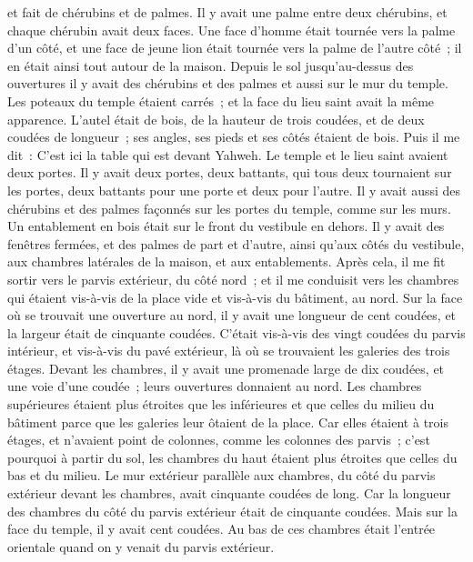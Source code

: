 \begin{multicols}{2}
et fait de chérubins et de palmes. Il y avait une palme entre deux chérubins, et chaque chérubin avait deux faces.
Une face d'homme était tournée vers la palme d'un côté, et une face de jeune lion était tournée vers la palme de l'autre côté~; il en était ainsi tout autour de la maison.
Depuis le sol jusqu'au-dessus des ouvertures il y avait des chérubins et des palmes et aussi sur le mur du temple.
Les poteaux du temple étaient carrés~; et la face du lieu saint avait la même apparence.
L'autel était de bois, de la hauteur de trois coudées, et de deux coudées de longueur~; ses angles, ses pieds et ses côtés étaient de bois. Puis il me dit~: C'est ici la table qui est devant Yahweh.
Le temple et le lieu saint avaient deux portes.
Il y avait deux portes, deux battants, qui tous deux tournaient sur les portes, deux battants pour une porte et deux pour l'autre.
Il y avait aussi des chérubins et des palmes façonnés sur les portes du temple, comme sur les murs. Un entablement en bois était sur le front du vestibule en dehors.
Il y avait des fenêtres fermées, et des palmes de part et d'autre, ainsi qu'aux côtés du vestibule, aux chambres latérales de la maison, et aux entablements.
\VerseOne{}Après cela, il me fit sortir vers le parvis extérieur, du côté nord~; et il me conduisit vers les chambres qui étaient vis-à-vis de la place vide et vis-à-vis du bâtiment, au nord.
Sur la face où se trouvait une ouverture au nord, il y avait une longueur de cent coudées, et la largeur était de cinquante coudées.
C'était vis-à-vis des vingt coudées du parvis intérieur, et vis-à-vis du pavé extérieur, là où se trouvaient les galeries des trois étages.
Devant les chambres, il y avait une promenade large de dix coudées, et une voie d'une coudée~; leurs ouvertures donnaient au nord.
Les chambres supérieures étaient plus étroites que les inférieures et que celles du milieu du bâtiment parce que les galeries leur ôtaient de la place.
Car elles étaient à trois étages, et n'avaient point de colonnes, comme les colonnes des parvis~; c'est pourquoi à partir du sol, les chambres du haut étaient plus étroites que celles du bas et du milieu.
Le mur extérieur parallèle aux chambres, du côté du parvis extérieur devant les chambres, avait cinquante coudées de long.
Car la longueur des chambres du côté du parvis extérieur était de cinquante coudées. Mais sur la face du temple, il y avait cent coudées.
Au bas de ces chambres était l'entrée orientale quand on y venait du parvis extérieur.

\end{multicols}
